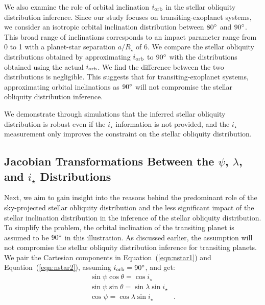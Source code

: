 \documentclass[twocolumn,times]{aastex631}
\begin{document}
We also examine the role of orbital inclination $i_{\rm orb}$ in the stellar obliquity distribution inference. Since our study focuses on transiting-exoplanet systems, we consider an isotropic orbital inclination distribution between $80\mbox{$^\circ$}$ and $90\mbox{$^\circ$}$. This broad range of inclinations corresponds to an impact parameter range from 0 to 1 with a planet-star separation $a/R_\star$ of 6.
We compare the stellar obliquity distributions obtained by approximating $i_{\rm orb}$ to $90\mbox{$^\circ$}$ with the distributions obtained using the actual $i_{\rm orb}$. We find the difference between the two distributions is negligible. This suggests that for transiting-exoplanet systems, approximating orbital inclinations as $90\mbox{$^\circ$}$ will not compromise the stellar obliquity distribution inference.

We demonstrate through simulations that the inferred stellar obliquity distribution is robust even if the $i_\star$ information is not provided, and the $i_\star$ measurement only improves the constraint on the stellar obliquity distribution.

\subsection{Jacobian Transformations Between the $\psi$, $\lambda$, and \lowercase{$i_\star$} Distributions}\label{subsec:jacobian}

Next, we aim to gain insight into the reasons behind the predominant role of the sky-projected stellar obliquity distribution and the less significant impact of the stellar inclination distribution in the inference of the stellar obliquity distribution. To simplify the problem, the orbital inclination of the transiting planet is assumed to be $90\mbox{$^\circ$}$ in this illustration. As discussed earlier, the assumption will not compromise the stellar obliquity distribution inference for transiting planets.
We pair the Cartesian components in Equation~(\ref{eqn:nstar1}) and Equation~(\ref{eqn:nstar2}), assuming $i_{\rm orb} = 90\mbox{$^\circ$}$, and get:
\begin{align}
    \sin{\psi}\cos{\theta} = \cos{i_\star}& \label{eq:coord1}\\
    \sin{\psi}\sin{\theta} = \sin{\lambda}\sin{i_\star}& \label{eq:coord2}\\
    \cos{\psi} = \cos{\lambda}\sin{i_\star} \label{eq:coord3}&.
\end{align}
\end{document}
